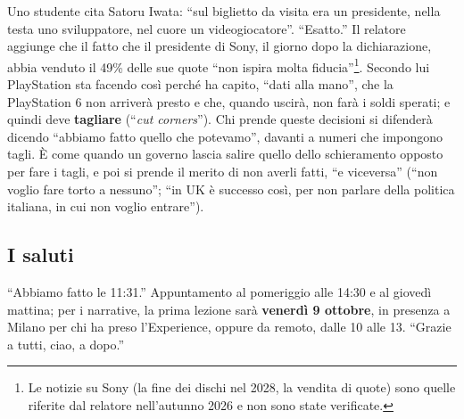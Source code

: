 Uno studente cita Satoru Iwata: ``sul biglietto da visita era un presidente,
nella testa uno sviluppatore, nel cuore un videogiocatore''. ``Esatto.'' Il
relatore aggiunge che il fatto che il presidente di Sony, il giorno dopo la
dichiarazione, abbia venduto il 49\% delle sue quote ``non ispira molta
fiducia''\footnote{Le notizie su Sony (la fine dei dischi nel 2028, la vendita
di quote) sono quelle riferite dal relatore nell'autunno 2026 e non sono state
verificate.}. Secondo lui PlayStation sta facendo così perché ha capito, ``dati
alla mano'', che la PlayStation 6 non arriverà presto e che, quando uscirà, non
farà i soldi sperati; e quindi deve \textbf{tagliare} (``\emph{cut corners}'').
Chi prende queste decisioni si difenderà dicendo ``abbiamo fatto quello che
potevamo'', davanti a numeri che impongono tagli. È come quando un governo
lascia salire quello dello schieramento opposto per fare i tagli, e poi si
prende il merito di non averli fatti, ``e viceversa'' (``non voglio fare torto
a nessuno''; ``in UK è successo così, per non parlare della politica italiana,
in cui non voglio entrare'').

\subsection{I saluti}

``Abbiamo fatto le 11:31.'' Appuntamento al pomeriggio alle 14:30 e al giovedì
mattina; per i narrative, la prima lezione sarà \textbf{venerdì 9 ottobre},
in presenza a Milano per chi ha preso l'Experience, oppure da remoto, dalle 10
alle 13. ``Grazie a tutti, ciao, a dopo.''
